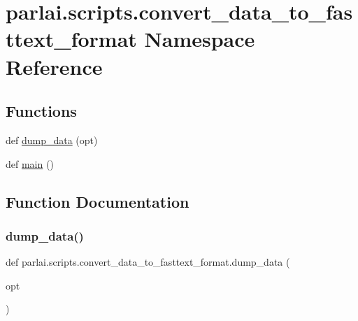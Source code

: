 \hypertarget{namespaceparlai_1_1scripts_1_1convert__data__to__fasttext__format}{}\section{parlai.\+scripts.\+convert\+\_\+data\+\_\+to\+\_\+fasttext\+\_\+format Namespace Reference}
\label{namespaceparlai_1_1scripts_1_1convert__data__to__fasttext__format}
\subsection*{Functions}
\begin{DoxyCompactItemize}
\item 
def \hyperlink{namespaceparlai_1_1scripts_1_1convert__data__to__fasttext__format_a8222f98bd2353f75b192224da0e07733}{dump\+\_\+data} (opt)
\item 
def \hyperlink{namespaceparlai_1_1scripts_1_1convert__data__to__fasttext__format_adef5d250b1de0b6c868a9eb4e699a81f}{main} ()
\end{DoxyCompactItemize}


\subsection{Function Documentation}
\mbox{\label{namespaceparlai_1_1scripts_1_1convert__data__to__fasttext__format_a8222f98bd2353f75b192224da0e07733}} 
\subsubsection{\texorpdfstring{dump\+\_\+data()}{dump\_data()}}
{\footnotesize\ttfamily def parlai.\+scripts.\+convert\+\_\+data\+\_\+to\+\_\+fasttext\+\_\+format.\+dump\+\_\+data (\begin{DoxyParamCaption}\item[{}]{opt }\end{DoxyParamCaption})}

